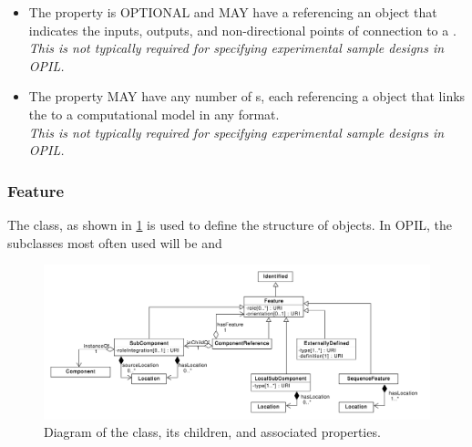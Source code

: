 \begin{itemize}
\item \label{sec:sbol:hasInterface}
The  property is OPTIONAL and MAY have a  referencing an  object that indicates the inputs, outputs, and non-directional points of connection to a .
\\{\em This is not typically required for specifying experimental sample designs in OPIL.}

\item \label{sec:sbol:hasModel}
The  property MAY have any number of s, each referencing a  object that links the  to a computational model in any format.
\\{\em This is not typically required for specifying experimental sample designs in OPIL.}
\end{itemize}

\subsubsection{Feature}
\label{sec:sbol:Feature}

The  class, as shown in \ref{uml:subcomponent} is used to define the structure of  objects.
In OPIL, the  subclasses most often used will be  and 

\begin{figure}[ht]
\begin{center}
\includegraphics[width=\textwidth]{sbol_uml/feature}
\caption[]{Diagram of the  class, its children, and associated properties.}
\label{uml:subcomponent}
\end{center}
\end{figure}

